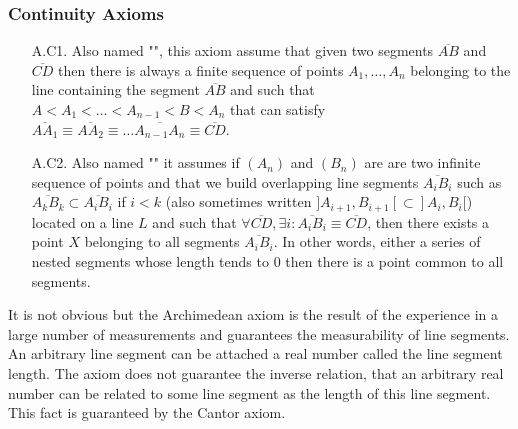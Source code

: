 	\subsubsection{Continuity Axioms}
	\begin{enumerate}
		\item[A.C1.] Also named "", this axiom assume that given two segments $\overline{AB}$ and $\overline{CD}$ then there is always a finite sequence of points $A_1,\ldots, A_n$ belonging to the line containing the segment $\overline{AB}$  and such that $A<A_1<\ldots<A_{n-1}<B<A_n$ that can satisfy $\overline{AA_1}\equiv \overline{AA_2}\equiv\ldots \overline{A_{n-1}A_n}\equiv \overline{CD}$.
	
		\item[A.C2.] Also named "" it assumes if $(A_n)$ and $(B_n)$ are are two infinite sequence of points and that we build overlapping line segments $\overline{A_iB_i}$ such as $\overline{A_{k}B_{k}} \subset \overline{A_iB_i}$ if $i<k$ (also sometimes written $]A_{i+1},B_{i+1}[\subset]A_i,B_i[$) located on a line $L$ and such that $\forall \overline{CD},\exists i: \overline{A_iB_i}\equiv\overline{CD}$, then there exists a point $X$ belonging to all segments $\overline{A_iB_i}$. In other words, either a series of nested segments whose length tends to $0$ then there is a point common to all segments.
	\end{enumerate}
	It is not obvious but the Archimedean axiom is the result of the experience in a large number of measurements and guarantees the measurability of line segments. An arbitrary line segment can be attached a real number called the line segment length. The axiom does not guarantee the inverse relation, that an arbitrary real number can be related to some line segment as the length of this line segment. This fact is guaranteed by the Cantor axiom.


